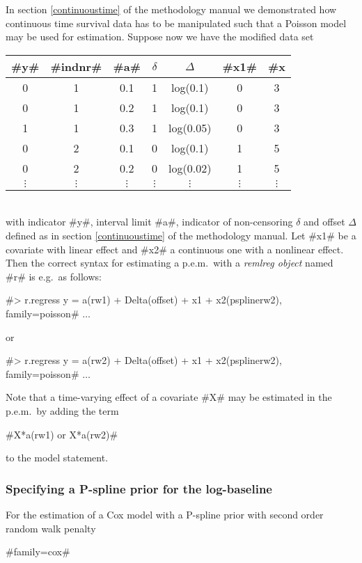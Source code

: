 In section \ref*{continuoustime} of the methodology manual we
demonstrated how continuous time survival data has to be manipulated
such that a Poisson model may be used for estimation. Suppose now we
have the modified data set
\vspace{0.5cm}\\
\begin{tabular}{c|c|c|c|c|c|c}
#y# & #indnr# & #a# & $\delta$ &  $\Delta$ &   #x1# &
#x#2\\\hline\hline
0 &  1 &   0.1 &   1  &  log(0.1) & 0  & 3\\
0  & 1   & 0.2  &  1  &  log(0.1) & 0 &  3\\
1  & 1   & 0.3  &  1  &  log(0.05)& 0  & 3\\\hline
0 &  2 &   0.1 &   0 &   log(0.1) & 1 &  5\\
0  & 2  &  0.2 &   0  &  log(0.02)& 1 &  5\\\hline
$\vdots$ & $\vdots$ & $\vdots$ & $\vdots$ & $\vdots$ & $\vdots$& $\vdots$\\
\end{tabular}
\vspace{0.5cm}\\
with indicator #y#, interval limit #a#, indicator of non-censoring
$\delta$ and offset $\Delta$ defined as in section
\ref*{continuoustime} of the methodology manual. Let #x1# be a
covariate with linear effect and #x2# a continuous one with a
nonlinear effect. Then the correct syntax for estimating a
p.e.m.~with a {\em remlreg object} named #r# is e.g.~as follows:

 #> r.regress y = a(rw1) + Delta(offset) + x1 + x2(psplinerw2), family=poisson# $\ldots$

or

 #> r.regress y = a(rw2) + Delta(offset) + x1 + x2(psplinerw2), family=poisson# $\ldots$

Note that a time-varying effect of a covariate #X# may be
estimated in the p.e.m.~by adding the term

#X*a(rw1) or X*a(rw2)#

to the model statement.

\subsubsection*{Specifying a P-spline prior for the log-baseline}

For the estimation of a Cox model with a P-spline prior with
second order random walk penalty

#family=cox#

